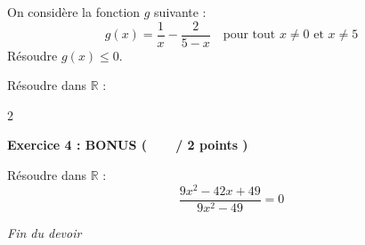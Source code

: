 \documentclass[12pt,a4paper]{exam}
\begin{document}
\begin{questions}

\question[1] On considère la fonction $g$ suivante :
\[
g(x) = \dfrac{1}{x} - \dfrac{2}{5-x} \quad \text{pour tout $x \neq 0$ et $x \neq 5$}
\]
Résoudre $g(x) \leq 0$.

\vspace{5pt}

\question[1] Résoudre dans $\mathbb{R}$ :
\begin{multicols}{2}
\end{multicols}

\end{questions}

\vspace{10pt}

\noindent
\textbf{Exercice 4 : BONUS (\ \ \ \  / 2 points )}
\vspace{5pt}

\begin{questions}

\question Résoudre dans $\mathbb{R}$ :
\[
\dfrac{9x^2-42x+49}{9x^2-49} = 0
\]

\end{questions}

\vspace{10pt}

\begin{center}
    \textit{Fin du devoir}
\end{center}
\end{document}

